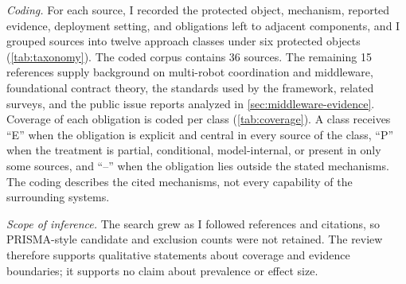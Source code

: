 \emph{Coding.}  For each source, I recorded the protected object, mechanism,
reported evidence, deployment setting, and obligations left to adjacent
components, and I grouped sources into twelve approach classes under six
protected objects (\cref{tab:taxonomy}).  The coded corpus contains 36 sources.
The remaining 15 references supply background on multi-robot coordination and
middleware, foundational contract theory, the standards used by the framework,
related surveys, and the public issue reports analyzed in
\cref{sec:middleware-evidence}.  Coverage of each obligation is coded per class
(\cref{tab:coverage}).  A class receives ``E'' when the obligation is explicit
and central in every source of the class, ``P'' when the treatment is partial,
conditional, model-internal, or present in only some sources, and ``--'' when
the obligation lies outside the stated mechanisms.  The coding describes the
cited mechanisms, not every capability of the surrounding systems.

\emph{Scope of inference.}  The search grew as I followed references and citations, so
PRISMA-style candidate and exclusion counts were not retained.  The review
therefore supports qualitative statements about coverage and evidence
boundaries; it supports no claim about prevalence or effect size.
